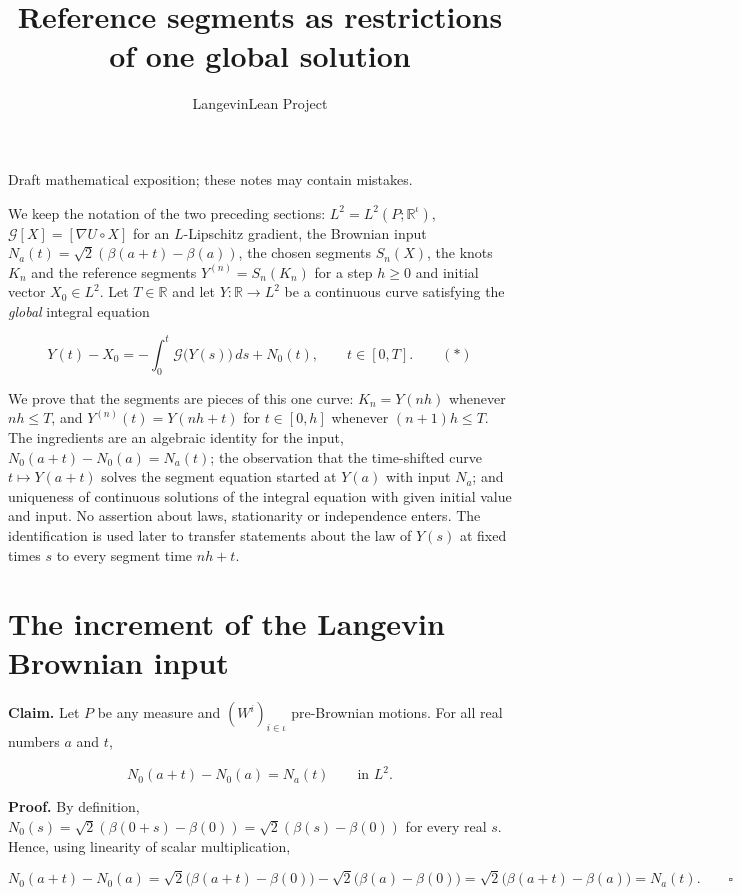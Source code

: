 \documentclass[11pt,a4paper]{article}
\title{\texorpdfstring{Reference segments as restrictions of one global solution}{Reference segments as restrictions of one global solution}}
\author{LangevinLean Project}
\date{}
\begin{document}
\maketitle
Draft mathematical exposition; these notes may contain mistakes.


We keep the notation of the two preceding sections: \(L^2=L^2(P;\mathbb R^\iota)\), \(\mathcal G[X]=[\nabla U\circ X]\) for an \(L\)-Lipschitz gradient, the Brownian input \(N_a(t)=\sqrt2(\beta(a+t)-\beta(a))\), the chosen segments \(S_n(X)\), the knots \(K_n\) and the reference segments \(Y^{(n)}=S_n(K_n)\) for a step \(h\ge0\) and initial vector \(X_0\in L^2\). Let \(T\in\mathbb R\) and let \(Y:\mathbb R\to L^2\) be a continuous curve satisfying the \emph{global} integral equation


\[Y(t)-X_0=-\int_0^t\mathcal G\bigl(Y(s)\bigr)\,ds+N_0(t),\qquad t\in[0,T].\qquad(\ast)\]


We prove that the segments are pieces of this one curve: \(K_n=Y(nh)\) whenever \(nh\le T\), and \(Y^{(n)}(t)=Y(nh+t)\) for \(t\in[0,h]\) whenever \((n+1)h\le T\). The ingredients are an algebraic identity for the input, \(N_0(a+t)-N_0(a)=N_a(t)\); the observation that the time-shifted curve \(t\mapsto Y(a+t)\) solves the segment equation started at \(Y(a)\) with input \(N_a\); and uniqueness of continuous solutions of the integral equation with given initial value and input. No assertion about laws, stationarity or independence enters. The identification is used later to transfer statements about the law of \(Y(s)\) at fixed times \(s\) to every segment time \(nh+t\).


\section{\texorpdfstring{The increment of the Langevin Brownian input}{The increment of the Langevin Brownian input}}


\textbf{Claim.} Let \(P\) be any measure and \((W^i)_{i\in\iota}\) pre-Brownian motions. For all real numbers \(a\) and \(t\),


\[N_0(a+t)-N_0(a)=N_a(t)\qquad\text{in }L^2.\]


\textbf{Proof.} By definition, \(N_0(s)=\sqrt2(\beta(0+s)-\beta(0))=\sqrt2(\beta(s)-\beta(0))\) for every real \(s\). Hence, using linearity of scalar multiplication,


\[N_0(a+t)-N_0(a)=\sqrt2\bigl(\beta(a+t)-\beta(0)\bigr)-\sqrt2\bigl(\beta(a)-\beta(0)\bigr)=\sqrt2\bigl(\beta(a+t)-\beta(a)\bigr)=N_a(t).\qquad\square\]
\end{document}
